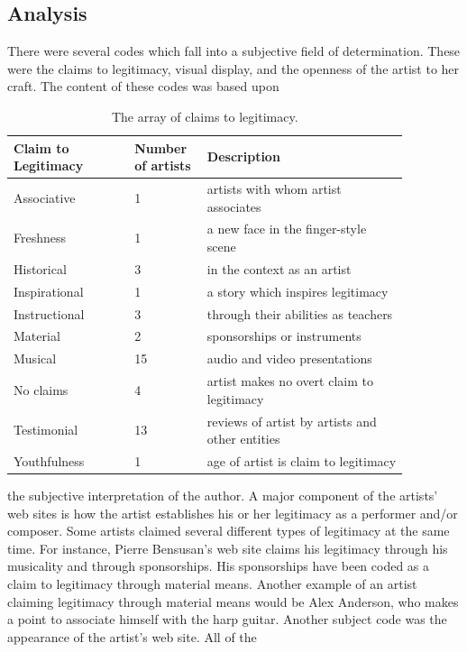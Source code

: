 \documentclass[nofonts,nobib]{tufte-handout}
\begin{document}
\subsection{Analysis}
\label{sec:analysis}

There were several codes which fall into a subjective field of
determination. These were the claims to legitimacy, visual display,
and the openness of the artist to her craft. The content of these
codes was based upon
\begin{table}
  \centering
  \small
  \begin{tabular}{p{0.27\linewidth}p{0.15\linewidth}p{0.45\linewidth}}\toprule
    Claim to Legitimacy & Number of artists & Description \\\midrule
    Associative & 1 & artists with whom artist associates \\
    Freshness & 1 & a new face in the finger-style scene \\
    Historical & 3 & in the context as an artist \\
    Inspirational & 1 & a story which inspires legitimacy \\
    Instructional & 3 & through their abilities as teachers \\
    Material & 2 & sponsorships or instruments \\
    Musical & 15 & audio and video presentations \\
    No claims & 4 & artist makes no overt claim to legitimacy \\
    Testimonial & 13 & reviews of artist by artists and other entities \\
    Youthfulness & 1 & age of artist is claim to legitimacy \\
      \bottomrule
  \end{tabular}
  \caption{The array of claims to legitimacy.}
\end{table}
the subjective interpretation of the author. A major component of the
artists' web sites is how the artist establishes his or her legitimacy
as a performer and/or composer. Some artists claimed several different
types of legitimacy at the same time. For instance, Pierre Bensusan's
web site claims his legitimacy through his musicality and through
sponsorships. His sponsorships have been coded as a claim to
legitimacy through material means. Another example of an artist
claiming legitimacy through material means would be Alex Anderson, who
makes a point to associate himself with the harp guitar. Another
subject code was the appearance of the artist's web site. All of the
\end{document}

